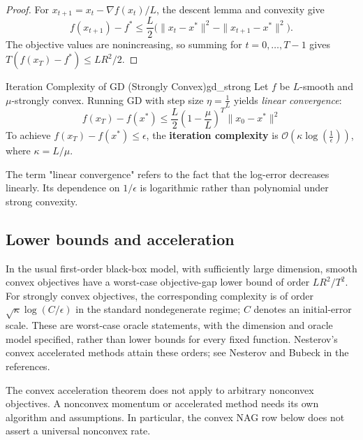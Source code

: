 \documentclass[11pt]{article}
\begin{document}
\begin{proof}
For $x_{t+1}=x_t-\nabla f(x_t)/L$, the descent lemma and convexity give
\[
f(x_{t+1})-f^*\le \frac L2\big(\|x_t-x^*\|^2-\|x_{t+1}-x^*\|^2\big).
\]
The objective values are nonincreasing, so summing for $t=0,\ldots,T-1$ gives $T(f(x_T)-f^*)\le LR^2/2$.
\end{proof}

\begin{theorem}{Iteration Complexity of GD (Strongly Convex)}{gd_strong}
Let $f$ be $L$-smooth and $\mu$-strongly convex. Running GD with step size $\eta = \frac{1}{L}$ yields \textit{linear convergence}:
\begin{equation}
    f(x_T) - f(x^*) \le \frac{L}{2} \left( 1 - \frac{\mu}{L} \right)^T \|x_0 - x^*\|^2
\end{equation}
To achieve $f(x_T) - f(x^*) \le \epsilon$, the \textbf{iteration complexity} is $\mathcal{O}\left( \kappa \log\left(\frac{1}{\epsilon}\right) \right)$, where $\kappa = L/\mu$.
\end{theorem}

\begin{remark}
The term "linear convergence" refers to the fact that the log-error decreases linearly. Its dependence on $1/\epsilon$ is logarithmic rather than polynomial under strong convexity.
\end{remark}

\subsection{Lower bounds and acceleration}
In the usual first-order black-box model, with sufficiently large dimension, smooth convex objectives have a worst-case objective-gap lower bound of order $LR^2/T^2$. For strongly convex objectives, the corresponding complexity is of order $\sqrt{\kappa}\log(C/\epsilon)$ in the standard nondegenerate regime; $C$ denotes an initial-error scale. These are worst-case oracle statements, with the dimension and oracle model specified, rather than lower bounds for every fixed function.
Nesterov's convex accelerated methods attain these orders; see Nesterov and Bubeck in the references.

\begin{remark}
The convex acceleration theorem does not apply to arbitrary nonconvex objectives. A nonconvex momentum or accelerated method needs its own algorithm and assumptions. In particular, the convex NAG row below does not assert a universal nonconvex rate.
\end{remark}
\end{document}

